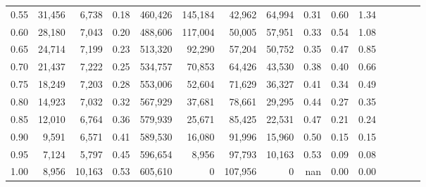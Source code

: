 \begin{tabular}{rrrcrrrrrrrrrrr}
0.55 &  31,456 &   6,738 &                                       0.18 &  460,426 &  145,184 &   42,962 &   64,994 &  0.31 &  0.60 &                         1.34 \\
0.60 &  28,180 &   7,043 &                                       0.20 &  488,606 &  117,004 &   50,005 &   57,951 &  0.33 &  0.54 &                         1.08 \\
0.65 &  24,714 &   7,199 &                                       0.23 &  513,320 &   92,290 &   57,204 &   50,752 &  0.35 &  0.47 &                         0.85 \\
0.70 &  21,437 &   7,222 &                                       0.25 &  534,757 &   70,853 &   64,426 &   43,530 &  0.38 &  0.40 &                         0.66 \\
0.75 &  18,249 &   7,203 &                                       0.28 &  553,006 &   52,604 &   71,629 &   36,327 &  0.41 &  0.34 &                         0.49 \\
0.80 &  14,923 &   7,032 &                                       0.32 &  567,929 &   37,681 &   78,661 &   29,295 &  0.44 &  0.27 &                         0.35 \\
0.85 &  12,010 &   6,764 &                                       0.36 &  579,939 &   25,671 &   85,425 &   22,531 &  0.47 &  0.21 &                         0.24 \\
0.90 &   9,591 &   6,571 &                                       0.41 &  589,530 &   16,080 &   91,996 &   15,960 &  0.50 &  0.15 &                         0.15 \\
0.95 &   7,124 &   5,797 &                                       0.45 &  596,654 &    8,956 &   97,793 &   10,163 &  0.53 &  0.09 &                         0.08 \\
1.00 &   8,956 &  10,163 &                                       0.53 &  605,610 &        0 &  107,956 &        0 &   nan &  0.00 &                         0.00 \\
\bottomrule
\end{tabular}
